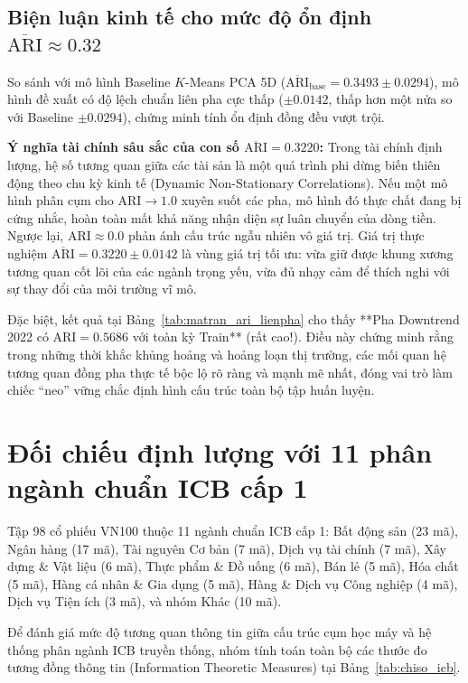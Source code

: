 \documentclass[12pt,a4paper,oneside,openany]{report}
\begin{document}
\subsection{Biện luận kinh tế cho mức độ ổn định \texorpdfstring{$\overline{\text{ARI}} \approx 0.32$}{ARI ~ 0.32}}
So sánh với mô hình Baseline $K$-Means PCA 5D ($\overline{\text{ARI}}_{\text{base}} = 0.3493 \pm 0.0294$), mô hình đề xuất có độ lệch chuẩn liên pha cực thấp ($\pm 0.0142$, thấp hơn một nửa so với Baseline $\pm 0.0294$), chứng minh tính ổn định đồng đều vượt trội.

\textbf{Ý nghĩa tài chính sâu sắc của con số $\overline{\text{ARI}} = 0.3220$:}  
Trong tài chính định lượng, hệ số tương quan giữa các tài sản là một quá trình phi dừng biến thiên động theo chu kỳ kinh tế (Dynamic Non-Stationary Correlations). Nếu một mô hình phân cụm cho $\text{ARI} \to 1.0$ xuyên suốt các pha, mô hình đó thực chất đang bị cứng nhắc, hoàn toàn mất khả năng nhận diện sự luân chuyển của dòng tiền. Ngược lại, $\text{ARI} \approx 0.0$ phản ánh cấu trúc ngẫu nhiên vô giá trị.  
Giá trị thực nghiệm $\overline{\text{ARI}} = 0.3220 \pm 0.0142$ là vùng giá trị tối ưu: vừa giữ được khung xương tương quan cốt lõi của các ngành trọng yếu, vừa đủ nhạy cảm để thích nghi với sự thay đổi của môi trường vĩ mô.

Đặc biệt, kết quả tại Bảng~\ref{tab:matran_ari_lienpha} cho thấy **Pha Downtrend 2022 có $\text{ARI} = 0.5686$ với toàn kỳ Train** (rất cao!). Điều này chứng minh rằng trong những thời khắc khủng hoảng và hoảng loạn thị trường, các mối quan hệ tương quan đồng pha thực tế bộc lộ rõ ràng và mạnh mẽ nhất, đóng vai trò làm chiếc ``neo'' vững chắc định hình cấu trúc toàn bộ tập huấn luyện.

\section{Đối chiếu định lượng với 11 phân ngành chuẩn ICB cấp 1}
\label{sec:doi_chieu_icb}

Tập 98 cổ phiếu VN100 thuộc 11 ngành chuẩn ICB cấp 1: Bất động sản (23 mã), Ngân hàng (17 mã), Tài nguyên Cơ bản (7 mã), Dịch vụ tài chính (7 mã), Xây dựng \& Vật liệu (6 mã), Thực phẩm \& Đồ uống (6 mã), Bán lẻ (5 mã), Hóa chất (5 mã), Hàng cá nhân \& Gia dụng (5 mã), Hàng \& Dịch vụ Công nghiệp (4 mã), Dịch vụ Tiện ích (3 mã), và nhóm Khác (10 mã).

Để đánh giá mức độ tương quan thông tin giữa cấu trúc cụm học máy và hệ thống phân ngành ICB truyền thống, nhóm tính toán toàn bộ các thước đo tương đồng thông tin (Information Theoretic Measures) \cite{vinh2010} tại Bảng~\ref{tab:chiso_icb}.
\end{document}
